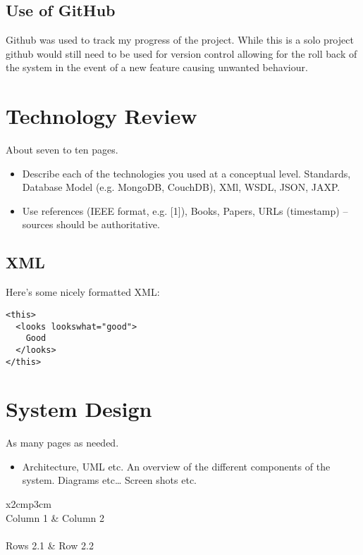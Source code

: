 \section{Use of GitHub}
Github was used to track my progress of the project. While this is a solo project github would still need to be used for version control allowing for the roll back of the system in the event of a new feature causing unwanted behaviour.




\chapter{Technology Review}
About seven to ten pages.
\begin{itemize}
\item Describe each of the technologies you used at a conceptual level. Standards, Database Model (e.g. MongoDB, CouchDB), XMl, WSDL, JSON, JAXP.
\item Use references (IEEE format, e.g. [1]), Books, Papers, URLs (timestamp) – sources should be authoritative. 
\end{itemize}

\section{XML}
Here's some nicely formatted XML:
\begin{verbatim}
<this>
  <looks lookswhat="good">
    Good
  </looks>
</this>
\end{verbatim}

\chapter{System Design}
As many pages as needed.
\begin{itemize}
\item Architecture, UML etc. An overview of the different components of the system. Diagrams etc… Screen shots etc.
\end{itemize}

\begin{table}[h]
  \centering
  \begin{tabular}{x{2cm}p{3cm}}
    \toprule \\
    Column 1 & Column 2 \\
    \midrule \\
    Rows 2.1 & Row 2.2 \\
    \bottomrule
  \end{tabular}
  \caption{A table.}
  \label{table:mytable}
\end{table}

